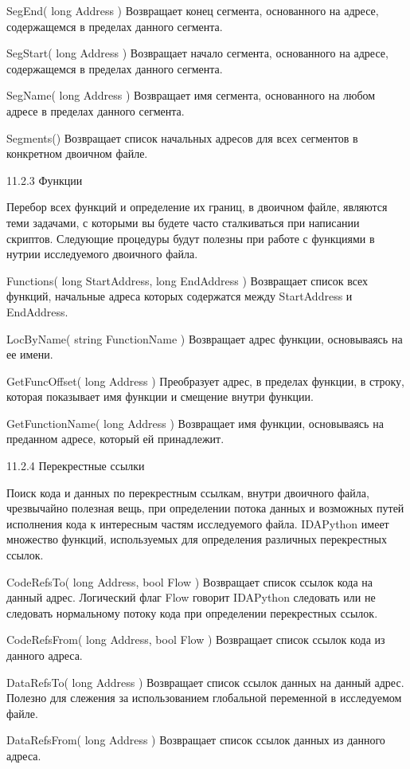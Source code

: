 \documentclass[12pt]{book}
\begin{document}
SegEnd( long Address )
Возвращает конец сегмента, основанного на адресе, содержащемся в пределах данного сегмента.

SegStart( long Address )
Возвращает начало сегмента, основанного на адресе, содержащемся в пределах данного сегмента.

SegName( long Address )
Возвращает имя сегмента, основанного на любом адресе в пределах данного сегмента.

Segments()
Возвращает список начальных адресов для всех сегментов в конкретном двоичном файле.

11.2.3 Функции

Перебор всех функций и определение их границ, в двоичном файле, являются теми задачами, с которыми вы будете часто сталкиваться при написании скриптов. Следующие процедуры будут полезны при работе с функциями в нутрии исследуемого двоичного файла.

Functions( long StartAddress, long EndAddress )
Возвращает список всех функций, начальные адреса которых содержатся между StartAddress и EndAddress.

LocByName( string FunctionName )
Возвращает адрес функции, основываясь на ее имени.

GetFuncOffset( long Address )
Преобразует адрес, в пределах функции, в строку, которая показывает имя функции и смещение внутри функции.

GetFunctionName( long Address )
Возвращает имя функции, основываясь на преданном адресе, который ей принадлежит.

11.2.4 Перекрестные ссылки

Поиск кода и данных по перекрестным ссылкам, внутри двоичного файла, чрезвычайно полезная вещь, при определении потока данных и возможных путей исполнения кода к интересным частям исследуемого файла. IDAPython имеет множество функций, используемых для определения различных перекрестных ссылок.

CodeRefsTo( long Address, bool Flow )
Возвращает список ссылок кода на данный адрес. Логический флаг Flow говорит IDAPython следовать или не следовать нормальному потоку кода при определении перекрестных ссылок.

CodeRefsFrom( long Address, bool Flow )
Возвращает список ссылок кода из данного адреса.

DataRefsTo( long Address )
Возвращает список ссылок данных на данный адрес. Полезно для слежения за использованием глобальной переменной в исследуемом файле.

DataRefsFrom( long Address )
Возвращает список ссылок данных из данного адреса. 
\end{document}
